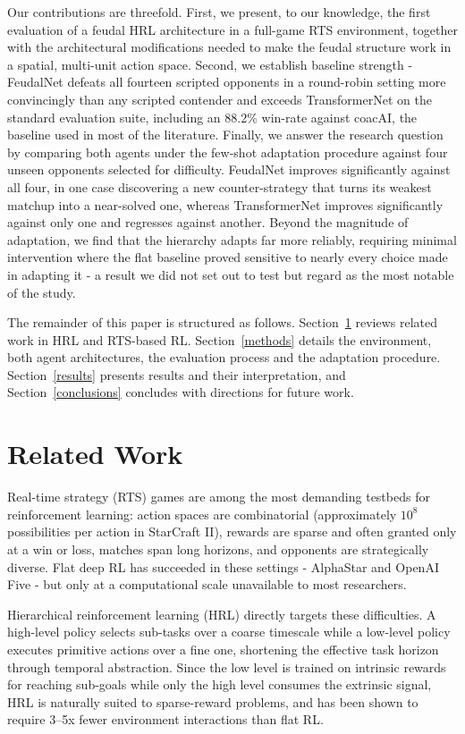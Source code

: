 \documentclass[sigconf,review=false]{acmart}
\begin{document}
Our contributions are threefold. 
First, we present, to our knowledge, the first evaluation of a feudal HRL architecture in a full-game RTS environment, together with the architectural modifications needed to make the feudal structure work in a spatial, multi-unit action space. 
Second, we establish baseline strength - FeudalNet defeats all fourteen scripted opponents in a round-robin setting more convincingly than any scripted contender and exceeds TransformerNet on the standard evaluation suite, including an $88.2\%$ win-rate against coacAI, the baseline used in most of the literature. 
Finally, we answer the research question by comparing both agents under the few-shot adaptation procedure against four unseen opponents selected for difficulty. 
FeudalNet improves significantly against all four, in one case discovering a new counter-strategy that turns its weakest matchup into a near-solved one, whereas TransformerNet improves significantly against only one and regresses against another. 
Beyond the magnitude of adaptation, we find that the hierarchy adapts far more reliably, requiring minimal intervention where the flat baseline proved sensitive to nearly every choice made in adapting it - a result we did not set out to test but regard as the most notable of the study.

The remainder of this paper is structured as follows.
Section~\ref{relatedworks} reviews related work in HRL and RTS-based RL. 
Section~\ref{methods} details the environment, both agent architectures, the evaluation process and the adaptation procedure.
Section~\ref{results} presents results and their interpretation, and
Section~\ref{conclusions} concludes with directions for future work.

\section{Related Work}
\label{relatedworks}

Real-time strategy (RTS) games are among the most demanding testbeds for reinforcement learning: action spaces are combinatorial (approximately $10^8$ possibilities per action in StarCraft II), rewards are sparse and often granted only at a win or loss, matches span long horizons, and opponents are strategically diverse. 
Flat deep RL has succeeded in these settings - AlphaStar \cite{alphastar} and OpenAI Five \cite{dota2five} - but only at a computational scale unavailable to most researchers.

Hierarchical reinforcement learning (HRL) directly targets these difficulties. 
A high-level policy selects sub-tasks over a coarse timescale while a low-level policy executes primitive actions over a fine one, shortening the effective task horizon through temporal abstraction.
Since the low level is trained on intrinsic rewards for reaching sub-goals while only the high level consumes the extrinsic signal, HRL is naturally suited to sparse-reward problems, and has been shown to require 3–5x fewer environment interactions \cite{HAC, badhrl} than flat RL.
\end{document}
